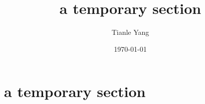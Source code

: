\documentclass[sectionlevel=section,status=draft]{noteformyself}
\title{a temporary section}
\author{Tianle Yang}
\date{\today}
\begin{document}
    \maketitle

    \section[
      status=draft,
      tag=00000,
      label=\labelNFM{sec:dynamics-on-berkovich-spaces:a-theorem-for-attractor-of-endomorphism-on-k-affinoid-spaces}
    ]{a temporary section}



    \printbibliography[heading=bibintoc, title={References}] %
\end{document}
